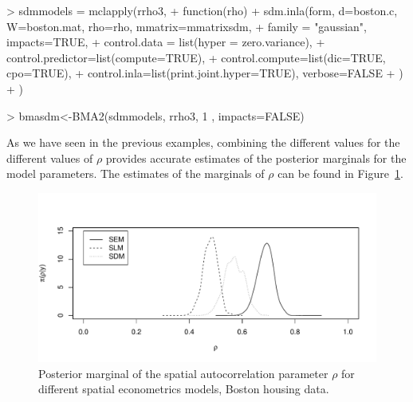 \documentclass[article]{jss}
\begin{document}
\begin{Schunk}
\begin{Sinput}
> sdmmodels = mclapply(rrho3,
+         function(rho) {
+                 sdm.inla(form, d=boston.c, W=boston.mat, rho=rho, mmatrix=mmatrixsdm,
+                         family = "gaussian", impacts=TRUE,
+                         control.data = list(hyper = zero.variance),
+                         control.predictor=list(compute=TRUE),
+                         control.compute=list(dic=TRUE, cpo=TRUE),
+                         control.inla=list(print.joint.hyper=TRUE), verbose=FALSE
+                 )
+         })
\end{Sinput}
\end{Schunk}

\begin{Schunk}
\begin{Sinput}
> bmasdm<-BMA2(sdmmodels, rrho3, 1 , impacts=FALSE)
\end{Sinput}
\end{Schunk}

As we have seen in the previous examples, combining the different values 
for the different values of $\rho$ provides accurate estimates of the posterior
marginals for the model parameters. The estimates of the marginals of
$\rho$ can be found in Figure~\ref{fig:pmargrho}.

\begin{figure}[h]
\begin{center}
\includegraphics{spatial_inla-044}
\end{center}
\caption{Posterior marginal of the spatial autocorrelation parameter $\rho$
for different spatial econometrics models, Boston housing data.}
\label{fig:pmargrho}
\end{figure} 



\end{document}
